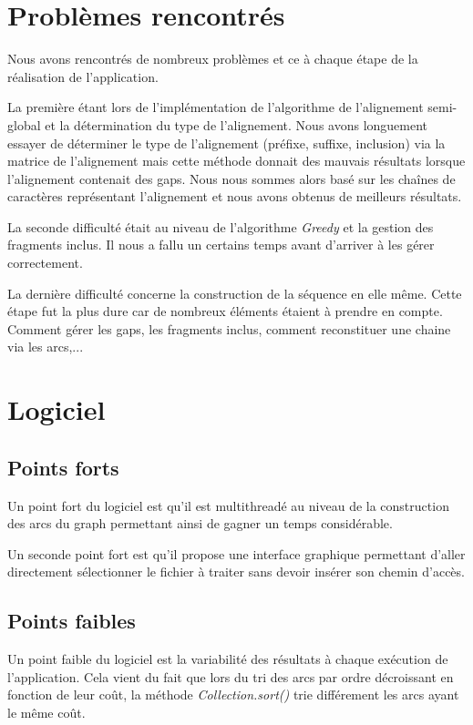\documentclass[12pt,a4paper,final]{article}
\begin{document}
\section{Problèmes rencontrés}

Nous avons rencontrés de nombreux problèmes et ce à chaque étape de la réalisation de l'application.\medskip

La première étant lors de l'implémentation de l'algorithme de l'alignement semi-global et la détermination du type de l'alignement.  Nous avons longuement essayer de déterminer le type de l'alignement (préfixe, suffixe, inclusion) via la matrice de l'alignement mais cette méthode donnait des mauvais résultats lorsque l'alignement contenait des gaps.  Nous nous sommes alors basé sur les chaînes de caractères représentant l'alignement et nous avons obtenus de meilleurs résultats.\medskip

La seconde difficulté était au niveau de l'algorithme \textit{Greedy} et la gestion des fragments inclus.  Il nous a fallu un certains temps avant d'arriver à les gérer correctement.\medskip

La dernière difficulté concerne la construction de la séquence en elle même.  Cette étape fut la plus dure car de nombreux éléments étaient à prendre en compte.  Comment gérer les gaps, les fragments inclus, comment reconstituer une chaine via les arcs,...

\section{Logiciel}

\subsection{Points forts}

Un point fort du logiciel est qu'il est multithreadé au niveau de la construction des arcs du graph permettant ainsi de gagner un temps considérable.

Un seconde point fort est qu'il propose une interface graphique permettant d'aller directement sélectionner le fichier à traiter sans devoir insérer son chemin d'accès.

\subsection{Points faibles}

Un point faible du logiciel est la variabilité des résultats à chaque exécution de l'application.  Cela vient du fait que lors du tri des arcs par ordre décroissant en fonction de leur coût, la méthode \textit{Collection.sort()} trie différement les arcs ayant le même coût.\medskip
\end{document}
